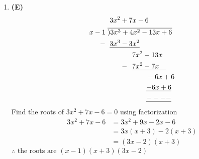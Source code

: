 \begin{multicols}{2}
\begin{enumerate}[label={\textbf{\arabic*.}}]
    \item \textbf{(E)}
    \begin{align*}
        &\hspace{3pt} 3x^2 + 7x - 6 \vspace{-10pt}\\ 
        x-1 \hspace{3pt}&\overline{)3x^3+4x^2-13x +6} \\
        -\hspace{3pt}& \hspace{3pt} \underline{3x^3 - 3x^2} \\
        \hspace{-40pt} & \hspace{35pt}  7x^2 - 13x \\ 
       -\hspace{-28pt} & \hspace{35pt} \underline{7x^2 - 7x \hspace{10pt}} \\
        & \hspace{55pt} -6x + 6 \\
        & \hspace{55pt} \underline{-6x + 6} \\
        & \hspace{55pt} \underline{----}
    \end{align*}
    Find the roots of $3x^2 + 7x -6 = 0$ using factorization 
    \begin{align*}
        3x^2 + 7x -6 &= 3x^2 + 9x - 2x -6  \\
        & = 3x(x+ 3) -2(x + 3) \\
        & = (3x - 2)(x + 3)
    \end{align*}
    $\therefore \text{ the roots are } (x-1)(x+3)(3x - 2)$


\end{enumerate}
\end{multicols}
